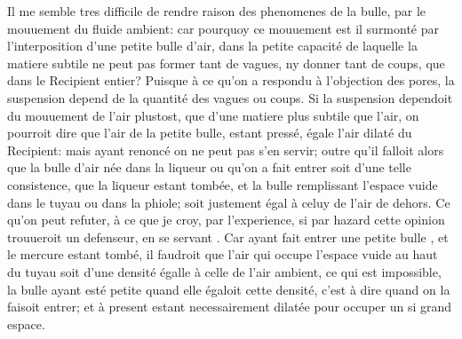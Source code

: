 \pstart Il me semble tres difficile de rendre raison des phenomenes de la bulle, par le mouuement  du fluide\protect{} ambient: car pourquoy ce mouuement  est il surmont\'{e} par l'interposition d'une petite bulle d'air, dans la petite capacit\'{e} de laquelle la matiere subtile\protect{} ne peut pas former tant de vagues, ny donner tant de coups, que dans le Recipient entier? Puisque \`{a} ce qu'on a respondu \`{a} l'objection des pores, la suspension depend de la quantit\'{e} des vagues ou coups. Si la suspension dependoit du mouuement de l'air\protect{} plustost, que d'une matiere\protect{} plus subtile que l'air, on pourroit dire que l'air de la petite bulle, estant press\'{e}, \'{e}gale l'air dilat\'{e} du Recipient: mais ayant renonc\'{e}  on ne peut pas s'en servir; outre qu'il falloit alors que la bulle d'air n\'{e}e dans la liqueur ou qu'on a fait entrer soit d'une telle consistence, que la liqueur estant tomb\'{e}e, et la bulle remplissant l'espace vuide\protect{} dans le tuyau ou dans la phiole; soit justement  \'{e}gal \`{a} celuy de l'air de dehors. Ce qu'on peut refuter, \`{a} ce que je croy, par l'experience, si par hazard cette opinion trouueroit un defenseur, en se servant . Car ayant fait entrer une petite bulle , et le mercure\protect{} estant tomb\'{e}, il faudroit que l'air qui occupe l'espace\protect{} vuide au haut du tuyau soit d'une densit\'{e} \'{e}galle \`{a} celle de l'air ambient, ce qui est impossible, la bulle ayant est\'{e} petite quand elle \'{e}galoit cette densit\'{e}, c'est \`{a} dire quand on la faisoit entrer; et \`{a} present estant necessairement dilat\'{e}e pour occuper un si grand espace.